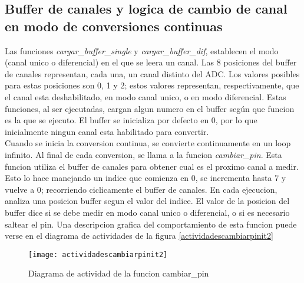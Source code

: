 \subsection{Buffer de canales y logica de cambio de canal en modo de conversiones continuas} %
\label{it2:sub:buffer_de_canales_y_logica_de_cambio_de_canal_en_modo_de_conversiones_continuas}

Las funciones \textit{cargar\_buffer\_single} y \textit{cargar\_buffer\_dif}, establecen el modo (canal unico o diferencial) en el que se leera un canal. Las 8 posiciones del buffer de canales representan, cada una, un canal distinto del ADC. Los valores posibles para estas posiciones son 0, 1 y 2; estos valores representan, respectivamente, que el canal esta deshabilitado, en modo canal unico, o en modo diferencial. Estas funciones, al ser ejecutadas, cargan algun numero en el buffer según que funcion es la que se ejecuto. El buffer se inicializa por defecto en 0, por lo que inicialmente ningun canal esta habilitado para convertir. \\

Cuando se inicia la conversion continua, se convierte continuamente en un loop infinito. Al final de cada conversion, se llama a la funcion \textit{cambiar\_pin}. Esta funcion utiliza el buffer de canales para obtener cual es el proximo canal a medir. Esto lo hace manejando un indice que comienza en 0, se incrementa hasta 7 y vuelve a 0; recorriendo ciclicamente el buffer de canales. 
En cada ejecucion, analiza una posicion buffer segun el valor del indice. El valor de la posicion del buffer dice si se debe medir en modo canal unico o diferencial, o si es necesario saltear el pin. Una descripcion grafica del comportamiento de esta funcion puede verse en el diagrama de actividades de la figura \ref{actividadescambiarpinit2} \\


\begin{figure}[h]
  \centering
  \texttt{[image: actividadescambiarpinit2]}
  \caption{Diagrama de actividad de la funcion cambiar\_pin}\label{fig:actividadescambiarpinit2}
\end{figure}


